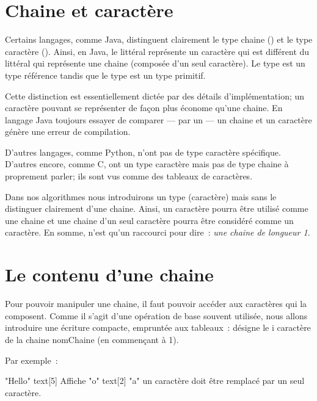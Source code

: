 	
\section{Chaine et caractère}

	Certains langages, comme Java, distinguent clairement le type chaine
	() et le type caractère ().  Ainsi, en
	Java, le littéral  représente un caractère qui est différent du
	littéral  qui représente une chaine (composée d’un seul caractère).
	Le type  est un type référence tandis que le type  est
	un type primitif. 

	Cette distinction est essentiellement dictée par des détails
	d’implémentation; un caractère pouvant se représenter de façon plus économe
	qu’une chaine. En langage Java toujours essayer de comparer — par un  — un chaine et un caractère génère une erreur de compilation. 

	D’autres langages, comme Python, n’ont pas de type caractère spécifique.
	D’autres encore, comme C, ont un type caractère mais pas de type chaine
	à proprement parler; ils sont vus comme des tableaux de caractères. 

	Dans nos algorithmes nous introduirons un type  (caractère)
	mais sans le distinguer clairement d’une chaine.  Ainsi, un caractère pourra
	être utilisé comme une chaine et une chaine d’un seul caractère pourra être
	considéré comme un caractère.  En somme,  n’est qu’un
	raccourci pour dire~: \emph{une chaine de longueur 1}. 
	
\section{Le contenu d’une chaine}

	Pour pouvoir manipuler une chaine, il faut pouvoir accéder aux caractères
	qui la composent.  Comme il s’agit d’une opération de base souvent utilisée,
	nous allons introduire une écriture compacte, empruntée aux tableaux~:
	 désigne le i\ieme{} caractère de la chaine nomChaine (en
	commençant à 1).
	
	Par exemple~:
	\begin{pseudocode}
		 \Gets "Hello"
		\Write text[5]	\RComment Affiche "o"
		\Let text[2] \Gets "a" 
			\Let\RComment un caractère doit être remplacé par un seul caractère.
	\end{pseudocode}

